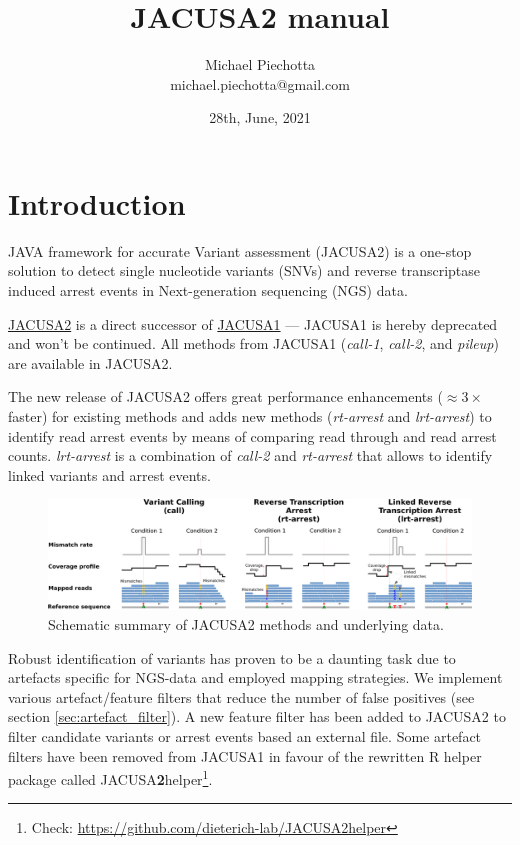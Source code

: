 \documentclass[10pt,a4paper,final]{article}
\title{JACUSA2 manual}
\author{Michael Piechotta \\ michael.piechotta@gmail.com}
\date{28th, June, 2021}
\begin{document}
\newcommand{\call}[1]{\textit{call-#1}\xspace}
\newcommand{\pileup}{\textit{pileup}\xspace}
\newcommand{\rtarrest}{\textit{rt-arrest}\xspace}
\newcommand{\lrtarrest}{\textit{lrt-arrest}\xspace}
\maketitle
\tableofcontents
\listoftodos
\newpage
\section{Introduction}
JAVA framework for accurate Variant assessment (JACUSA2) is a one-stop solution to detect single
nucleotide variants (SNVs) and reverse transcriptase induced arrest events in Next-generation
sequencing (NGS) data.

\href{https://github.com/dieterich-lab/JACUSA2/}{JACUSA2} is a direct successor of 
\href{https://github.com/dieterich-lab/JACUSA/}{JACUSA1} --- JACUSA1 is hereby deprecated and won't be 
continued. All methods from JACUSA1 (\call{1}, \call{2}, and \pileup) are available in JACUSA2.

The new release of JACUSA2 offers great performance enhancements ($\approx3\times$ faster) for existing methods
and adds new methods (\rtarrest and \lrtarrest) to identify read arrest events by means of comparing 
read through and read arrest counts. \lrtarrest is a combination of \call{2} and \rtarrest that 
allows to identify linked variants and arrest events.

\begin{figure}[ht]
  \centering
  \includegraphics[width=\textwidth]{figures/jacusa_methods_cropped}
  \caption{Schematic summary of JACUSA2 methods and underlying data.}
  \label{fig:methods}
\end{figure}

Robust identification of variants has proven to be a daunting task due to artefacts specific for
NGS-data and employed mapping strategies. We implement various artefact/feature filters that reduce
the number of false positives (see section \ref{sec:artefact_filter}). A new feature filter has been
added to JACUSA2 to filter candidate variants or arrest events based an external file.
Some artefact filters have been removed from JACUSA1 in favour of the rewritten R helper package called 
JACUSA\textbf{2}helper\footnote{Check: \url{https://github.com/dieterich-lab/JACUSA2helper}}.
\end{document}
